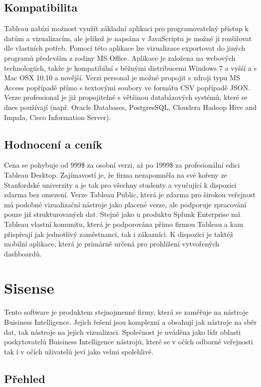 \documentclass[czech,BP]{thesiskiv}
\begin{document}
 \subsection{Kompatibilita}
 Tableau nabízí možnost využít základní aplikaci pro programovatelný přístup k datům a vizualizacím, ale jelikož je napsána v JavaScriptu je možné ji rozšiřovat dle vlastních potřeb. Pomocí této aplikace lze vizualizace exportovat do jiných programů především z rodiny MS Office. Aplikace je založena na webových technologiích, takže je kompatibilní s běžnými distribucemi Windows 7 a vyšší a s Mac OSX 10.10 a novější. Verzi personal je možné propojit s zdroji typu MS Access popřípadě přímo s textovými soubory ve formátu CSV popřípadě JSON. Verze professional je již propojitelné s většinou databázových systémů, které se dnes používají (např. Oracle Databases, PostgresSQL, Cloudera Hadoop Hive and Impala, Cisco Information Server).\cite{TableauSources}
 
 \subsection{Hodnocení a ceník}
 Cena se pohybuje od 999\$ za osobní verzi, až po 1999\$ za profesionální edici Tableau Desktop.\cite{TableauPricing} Zajímavostí je, že firma nezapomněla na své kořeny ze Stanfordské univerzity a je tak pro všechny studenty a vyučující k dispozici zdarma bez omezení. Verze Tableau Public, která je zdarma pro širokou veřejnost má podobné vizualizační nástroje jako placené verze, ale podporuje zpracování pouze již strukturovaných dat. Stejně jako u produktu Splunk Enterprise má Tableau vlastní komunitu, která je podporována přímo firmou Tableau a kam přispívají jak jednotlivý zaměstnanci, tak i zákazníci. K dispozici je taktéž mobilní aplikace, která je primárně určená pro prohlížení vytvořených dashboardů. 
 
 \section{Sisense}
  Tento software je produktem stejnojmenné firmy, která se zaměřuje na nástroje Buisiness Intelligence. Jejich řešení jsou komplexní a obsahují jak nástroje na sběr dat, tak nástroje na jejich vizualizaci. Společnost je uváděna jako lídr oblasti poskytovatelů Buisiness Intelligence nástrojů, které se v očích odborné veřejnosti tak i v očích uživatelů jeví jako velmi spolehlivé.\cite{SisenseStandings}
 
 \subsection{Přehled}
\end{document}

